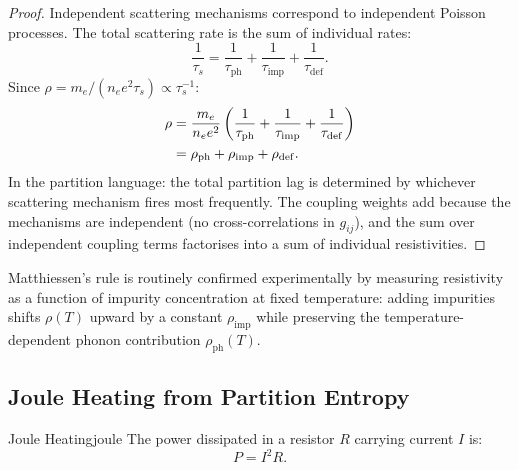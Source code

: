 \begin{proof}
Independent scattering mechanisms correspond to independent Poisson
processes.  The total scattering rate is the sum of individual rates:
\begin{equation}
  \frac{1}{\tau_s} = \frac{1}{\tau_{\mathrm{ph}}}
    + \frac{1}{\tau_{\mathrm{imp}}}
    + \frac{1}{\tau_{\mathrm{def}}}.
\end{equation}
Since $\rho = m_e/(n_e e^2\tau_s) \propto \tau_s^{-1}$:
\begin{align}
  \rho &= \frac{m_e}{n_e e^2}
    \left(\frac{1}{\tau_{\mathrm{ph}}}
        + \frac{1}{\tau_{\mathrm{imp}}}
        + \frac{1}{\tau_{\mathrm{def}}}\right) \notag\\
       &= \rho_{\mathrm{ph}} + \rho_{\mathrm{imp}} + \rho_{\mathrm{def}}.
\end{align}
In the partition language: the total partition lag is determined by
whichever scattering mechanism fires most frequently.  The coupling
weights add because the mechanisms are independent (no cross-correlations
in $g_{ij}$), and the sum over independent coupling terms factorises into
a sum of individual resistivities.
\end{proof}

Matthiessen's rule is routinely confirmed experimentally by measuring
resistivity as a function of impurity concentration at fixed temperature:
adding impurities shifts $\rho(T)$ upward by a constant $\rho_{\mathrm{imp}}$
while preserving the temperature-dependent phonon contribution
$\rho_{\mathrm{ph}}(T)$.

\subsection{Joule Heating from Partition Entropy}

\begin{consequence}{Joule Heating}{joule}
The power dissipated in a resistor $R$ carrying current $I$ is:
\begin{equation}
  P = I^2 R.
  \label{eq:ch18-joule}
\end{equation}
\end{consequence}

